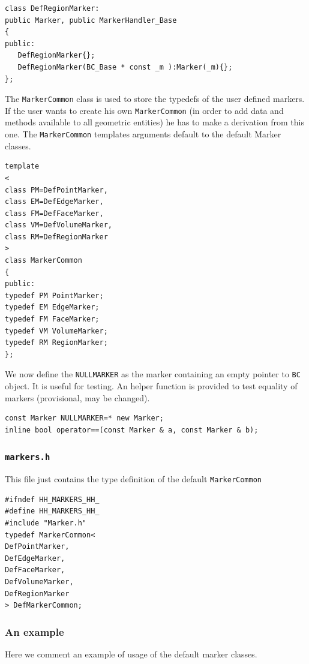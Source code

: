 \begin{verbatim}
class DefRegionMarker: 
public Marker, public MarkerHandler_Base 
{
public:
   DefRegionMarker{};
   DefRegionMarker(BC_Base * const _m ):Marker(_m){};
};

\end{verbatim}

The \texttt{MarkerCommon} class is used to store the typedefs of the
user defined markers. If the user wants to create his own
\texttt{MarkerCommon} (in order to add data and methods available to all
geometric entities) he has to make a derivation from this one.
The \texttt{MarkerCommon} templates arguments default to the default
Marker classes.

\begin{verbatim}
template
<
class PM=DefPointMarker,
class EM=DefEdgeMarker,
class FM=DefFaceMarker,
class VM=DefVolumeMarker,
class RM=DefRegionMarker
>
class MarkerCommon
{
public:
typedef PM PointMarker;
typedef EM EdgeMarker;
typedef FM FaceMarker;
typedef VM VolumeMarker;
typedef RM RegionMarker;
};
\end{verbatim}

We now define the \texttt{NULLMARKER} as the marker containing an
empty pointer to \texttt{BC} object.  It is useful for testing. An
helper function is provided to test equality of markers (provisional,
may be changed).

\begin{verbatim}
const Marker NULLMARKER=* new Marker; 
inline bool operator==(const Marker & a, const Marker & b);
\end{verbatim}


\subsubsection{\texttt{markers.h}}
This file just contains the type definition of the
default \texttt{MarkerCommon}
\begin{verbatim}
#ifndef HH_MARKERS_HH_
#define HH_MARKERS_HH_
#include "Marker.h"
typedef MarkerCommon<
DefPointMarker,
DefEdgeMarker,
DefFaceMarker,
DefVolumeMarker,
DefRegionMarker
> DefMarkerCommon;
\end{verbatim}

\subsubsection{An example}
Here we comment an example of usage of the default marker classes.

